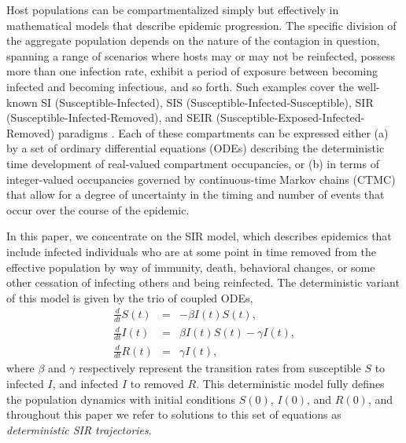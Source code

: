 \documentclass[12pt,titlepage]{article}
\newcommand{\ajd}[1]{{\color{black} #1}}
\begin{document}
Host populations can be compartmentalized simply but effectively in 
mathematical models that describe epidemic progression.  The specific division of the 
aggregate population depends on the nature of the contagion in question, spanning a range 
of scenarios where hosts may or may not be reinfected, possess more than one infection 
rate, exhibit a period of exposure between becoming infected and becoming infectious, and 
so forth.  Such examples cover the well-known SI (Susceptible-Infected), 
SIS (Susceptible-Infected-Susceptible), SIR (Susceptible-Infected-Removed), and SEIR 
(Susceptible-Exposed-Infected-Removed) paradigms \citep{Anderson:1991fk, Keeling:2008zr}.
Each of these compartments can be expressed either
(a) by a set of ordinary differential equations (ODEs) describing the deterministic
time development of real-valued compartment occupancies, or (b) in terms of integer-valued
occupancies governed by continuous-time Markov chains (CTMC) that allow for a degree of
uncertainty in the timing and number of events that occur over the course of the epidemic.


In this paper, we concentrate on the SIR model, which describes epidemics that 
include infected individuals who are at some point in time removed from the effective 
population by way of immunity, death, behavioral changes, or some other cessation of infecting others and being 
reinfected.  
The deterministic variant of this model is given by the trio of coupled
ODEs,
\begin{eqnarray}
\frac{d}{dt} S(t) &=& - \beta I(t)S(t),\label{eq:SIR1}\\
\frac{d}{dt} I(t) &=& \beta I(t)S(t) - \gamma I(t),\label{eq:SIR2}\\
\frac{d}{dt} R(t) &=& \gamma I(t),\label{eq:SIR3}
\end{eqnarray}
where $\beta$ and $\gamma$ respectively represent the transition rates
from susceptible $S$ to infected $I$, and infected $I$ to removed
$R$. 
\ajd{This deterministic model fully defines the population dynamics with initial conditions $S(0)$, $I(0)$, and $R(0)$, and}
 throughout this paper we refer to solutions to this set of
equations as \emph{deterministic SIR trajectories}.
\end{document}

